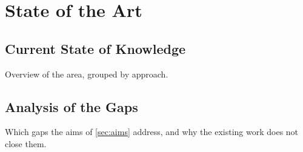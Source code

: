 \chapter{State of the Art}
\label{ch:state-of-the-art}

\section{Current State of Knowledge}
\label{sec:current-state}
Overview of the area, grouped by approach.

\section{Analysis of the Gaps}
\label{sec:gaps}
Which gaps the aims of \cref{sec:aims} address, and why the existing work does not close them.
